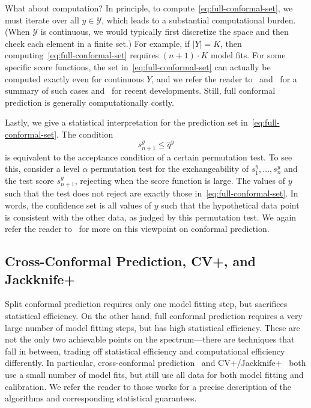 \documentclass[10pt]{article}
\begin{document}
What about computation?
In principle, to compute~\eqref{eq:full-conformal-set}, we must iterate over all $y \in \mathcal{Y}$, which leads to a substantial computational burden. 
(When $\mathcal{Y}$ is continuous, we would typically first discretize the space and then check each element in a finite set.) 
For example, if $|Y|=K$, then computing~\eqref{eq:full-conformal-set} requires $(n+1) \cdot K$ model fits. 
For some specific score functions, the set in~\eqref{eq:full-conformal-set} can actually be computed exactly even for continuous $Y$, and we refer the reader to~\cite{vovk2005algorithmic} and~\cite{shafer2008tutorial} for a summary of such cases and~\cite{ndiaye2019, Ndiaye2022root-finding} for recent developments. 
Still, full conformal prediction is generally computationally costly.

Lastly, we give a statistical interpretation for the prediction set in~\eqref{eq:full-conformal-set}. 
The condition 
\begin{equation}
    s^y_{n+1} \leq \hat{q}^y
\end{equation}
is equivalent to the acceptance condition of a certain permutation test. 
To see this, consider a level $\alpha$ permutation test for the exchangeability of $s_1^y,\dots,s_n^y$ and the test score $s_{n+1}^y$, rejecting when the score function is large. 
The values of $y$ such that the test does not reject are exactly those in~\eqref{eq:full-conformal-set}.
In words, the confidence set is all values of $y$ such that the hypothetical data point is consistent with the other data, as judged by this permutation test.
We again refer the reader to~\cite{vovk2005algorithmic} for more on this viewpoint on conformal prediction.

\subsection{Cross-Conformal Prediction, CV+, and Jackknife+}

Split conformal prediction requires only one model fitting step, but sacrifices statistical efficiency. On the other hand, full conformal prediction requires a very large number of model fitting steps, but has high statistical efficiency. These are not the only two achievable points on the spectrum---there are techniques that fall in between, trading off statistical efficiency and computational efficiency differently. In particular, cross-conformal prediction~\cite{vovk2015cross} and CV+/Jackknife+~\cite{barber2021predictive} both use a small number of model fits, but still use all data for both model fitting and calibration. We refer the reader to those works for a precise description of the algorithms and corresponding statistical guarantees.
\end{document}
